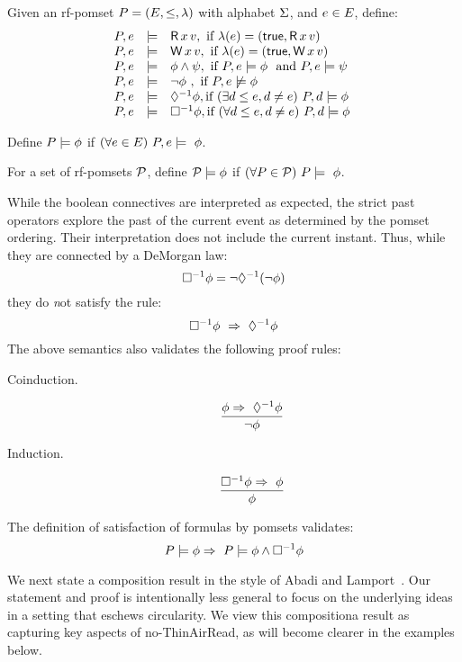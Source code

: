 \begin{definition} [Satisfaction]
Given an rf-pomset  $P= (E, {\le}, \lambda)$ with alphabet $\Sigma$, and  $e \in E$, define:
\[
\begin{array}{lrl}
 \aPS,\aEv & \models& \DR{\aLoc}{\aVal}, \ \mbox{if } \labelling(\aEv) =  (\TRUE, \DR{\aLoc}{\aVal}) \\
\aPS,\aEv &\models& \DW{\aLoc}{\aVal}, \ \mbox{if } \labelling(\aEv) =  (\TRUE, \DW{\aLoc}{\aVal}) \\
\aPS,\aEv &\models&  \afo\wedge\bfo, \ \mbox{if } \aPS,\aEv \models  \afo\ \mbox{ and } \aPS,\aEv \models  \bfo\  \\
\aPS,\aEv &\models&  \neg\afo\ , \ \mbox{if } \aPS,\aEv \not\models \afo \\
 \aPS,\aEv &\models& \once\afo, \mbox{if } (\exists \bEv \le \aEv, \bEv\not=\aEv) \  \aPS,\bEv \models \afo\  \\
 \aPS,\aEv &\models& \pastalways\afo, \mbox{if } (\forall \bEv \le \aEv, \bEv\not=\aEv) \  \aPS,\bEv \models \afo\ 
\end{array} 
\]

Define $P \models \phi$ if $(\forall \aEv \in \Event) \ \aPS,\aEv  \models\ \afo$.

For a set of rf-pomsets $\mathcal{P}$, define $\mathcal{P}\models \phi$ if $(\forall \aPS \in \aPSS) \ \aPS \models\ \afo$.
\end{definition}
While the boolean connectives are interpreted as expected, the strict past operators explore the past of the current event as determined by the pomset ordering.  Their interpretation does not include the current instant.  Thus, while they are connected by a DeMorgan law:
\[ \Box^{-1}\phi = \neg\Diamond^{-1}(\neg\phi) \]
they do {\emph not} satisfy the rule:
\[ \Box^{-1}\phi\ \Rightarrow\ \Diamond^{-1}\phi \]
The above semantics also validates the following proof rules:
\begin{description}
\item[Coinduction. ]
\[ \frac{\afo \Rightarrow\ \once{\afo}}{\neg \afo} \]
\item[Induction.] 
\[ \frac{\pastalways\afo \Rightarrow\ \afo}{\afo} \]
\end{description}
The definition of satisfaction of formulas by pomsets validates:
\[ P \models \phi \Rightarrow\ P \models \phi \wedge \Box^{-1}\phi \]



We next state a composition result in the style of Abadi and Lamport~\cite{Abadi:1993:CS:151646.151649}.  Our statement and proof is intentionally less general to focus on the underlying ideas in a setting that eschews circularity.    We view this compositiona result as capturing key aspects of no-ThinAirRead, as will become clearer in the examples below.

